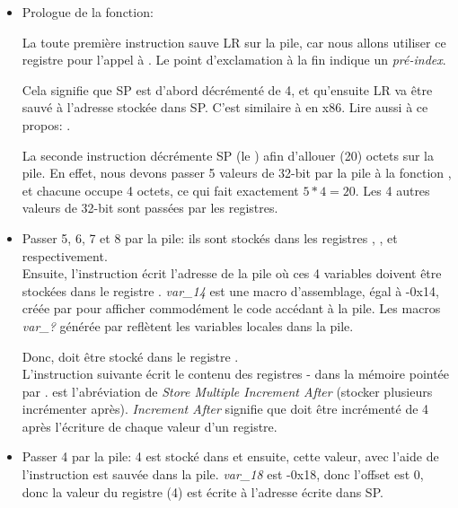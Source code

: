 \begin{itemize}
\item Prologue de la fonction:

La toute première instruction  sauve \ac{LR} sur la pile,
car nous allons utiliser ce registre pour l'appel à \printf.
Le point d'exclamation à la fin indique un \emph{pré-index}.

Cela signifie que \ac{SP} est d'abord décrémenté de 4, et qu'ensuite \ac{LR}
va être sauvé à l'adresse stockée dans \ac{SP}.
C'est similaire à \PUSH en x86.
Lire aussi à ce propos: .

La seconde instruction  décrémente \ac{SP} (le )
afin d'allouer  (20) octets sur la pile.
En effet, nous devons passer 5 valeurs de 32-bit par la pile à la fonction \printf,
et chacune occupe 4 octets, ce qui fait exactement $5*4=20$.
Les 4 autres valeurs de 32-bit sont passées par les registres.

\item Passer 5, 6, 7 et 8 par la pile: ils sont stockés dans les registres ,
,  et  respectivement.\\
Ensuite, l'instruction  écrit l'adresse de la pile
où ces 4 variables doivent être stockées dans le registre .
\emph{var\_14} est une macro d'assemblage, égal à -0x14, créée par \IDA pour afficher
commodément le code accédant à la pile.
Les macros \emph{var\_?} générée par \IDA reflètent les variables locales dans la pile.

Donc,  doit être stocké dans le registre . \\
L'instruction suivante  écrit le contenu des registres
- dans la mémoire pointée par .
 est l'abréviation de \emph{Store Multiple Increment After} (stocker plusieurs incrémenter après).
\emph{Increment After} signifie que  doit être incrémenté de 4 après
l'écriture de chaque valeur d'un registre.

\item Passer 4 par la pile: 4 est stocké dans  et ensuite, cette valeur, avec l'aide de \\
l'instruction  est sauvée dans la pile.
\emph{var\_18} est -0x18, donc l'offset est 0, donc la valeur du registre 
(4) est écrite à l'adresse écrite dans \ac{SP}.


\end{itemize}
